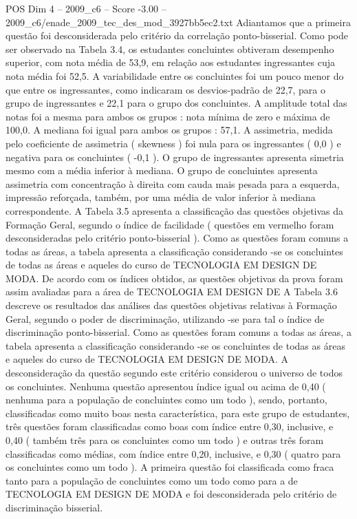 \begin{textsample}{POS Dim 4 – 2009\_c6 – Score -3.00 – 2009\_c6/enade\_2009\_tec\_des\_mod\_3927bb5ec2.txt}
Adiantamos que a primeira questão foi desconsiderada pelo critério da correlação ponto-bisserial.
Como pode ser observado na Tabela 3.4, os estudantes concluintes obtiveram desempenho superior, com nota média de 53,9, em relação aos estudantes ingressantes cuja nota média foi 52,5.
A variabilidade entre os concluintes foi um pouco menor do que entre os ingressantes, como indicaram os desvios-padrão de 22,7, para o grupo de ingressantes e 22,1 para o grupo dos concluintes.
A amplitude total das notas foi a mesma para ambos os grupos : nota mínima de zero e máxima de 100,0.
A mediana foi igual para ambos os grupos : 57,1.
A assimetria, medida pelo coeficiente de assimetria ( skewness ) foi nula para os ingressantes ( 0,0 ) e negativa para os concluintes ( -0,1 ).
O grupo de ingressantes apresenta simetria mesmo com a média inferior à mediana.
O grupo de concluintes apresenta assimetria com concentração à direita com cauda mais pesada para a esquerda, impressão reforçada, também, por uma média de valor inferior à mediana correspondente.
A Tabela 3.5 apresenta a classificação das questões objetivas da Formação Geral, segundo o índice de facilidade ( questões em vermelho foram desconsideradas pelo critério ponto-bisserial ).
Como as questões foram comuns a todas as áreas, a tabela apresenta a classificação considerando -se os concluintes de todas as áreas e aqueles do curso de TECNOLOGIA EM DESIGN DE MODA.
De acordo com os índices obtidos, as questões objetivas da prova foram assim avaliadas para a área de TECNOLOGIA EM DESIGN DE A Tabela 3.6 descreve os resultados das análises das questões objetivas relativas à Formação Geral, segundo o poder de discriminação, utilizando -se para tal o índice de discriminação ponto-bisserial.
Como as questões foram comuns a todas as áreas, a tabela apresenta a classificação considerando -se os concluintes de todas as áreas e aqueles do curso de TECNOLOGIA EM DESIGN DE MODA.
A desconsideração da questão segundo este critério considerou o universo de todos os concluintes.
Nenhuma questão apresentou índice igual ou acima de 0,40 ( nenhuma para a população de concluintes como um todo ), sendo, portanto, classificadas como muito boas nesta característica, para este grupo de estudantes, três questões foram classificadas como boas com índice entre 0,30, inclusive, e 0,40 ( também três para os concluintes como um todo ) e outras três foram classificadas como médias, com índice entre 0,20, inclusive, e 0,30 ( quatro para os concluintes como um todo ).
A primeira questão foi classificada como fraca tanto para a população de concluintes como um todo como para a de TECNOLOGIA EM DESIGN DE MODA e foi desconsiderada pelo critério de discriminação bisserial.

\end{textsample}

